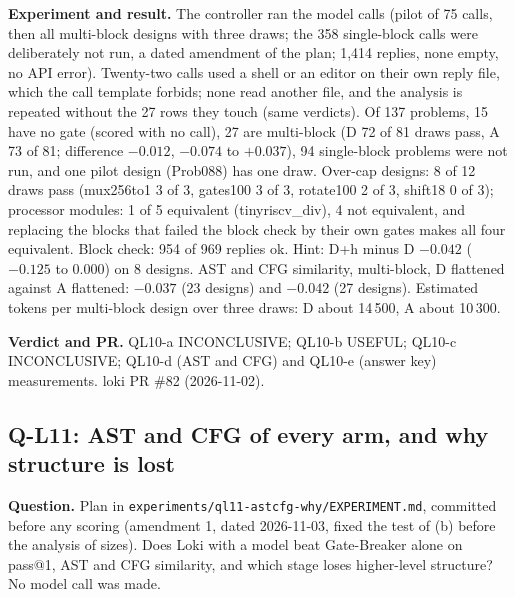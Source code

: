 \documentclass[conference]{IEEEtran}
\newcommand{\hev}[1]{\par\smallskip\noindent\textbf{#1}}
\newcommand{\code}[1]{\texttt{#1}}
\begin{document}
\hev{Experiment and result.} The controller ran the model calls (pilot of 75 calls, then all multi-block designs with three draws; the 358 single-block calls were deliberately not run, a dated amendment of the plan; 1,414 replies, none empty, no API error). Twenty-two calls used a shell or an editor on their own reply file, which the call template forbids; none read another file, and the analysis is repeated without the 27 rows they touch (same verdicts). Of 137 problems, 15 have no gate (scored with no call), 27 are multi-block (D 72 of 81 draws pass, A 73 of 81; difference $-0.012$, $-0.074$ to $+0.037$), 94 single-block problems were not run, and one pilot design (Prob088) has one draw. Over-cap designs: 8 of 12 draws pass (mux256to1 3 of 3, gates100 3 of 3, rotate100 2 of 3, shift18 0 of 3); processor modules: 1 of 5 equivalent (tinyriscv\_div), 4 not equivalent, and replacing the blocks that failed the block check by their own gates makes all four equivalent. Block check: 954 of 969 replies ok. Hint: D+h minus D $-0.042$ ($-0.125$ to 0.000) on 8 designs. AST and CFG similarity, multi-block, D flattened against A flattened: $-0.037$ (23 designs) and $-0.042$ (27 designs). Estimated tokens per multi-block design over three draws: D about 14\,500, A about 10\,300.

\hev{Verdict and PR.} QL10-a INCONCLUSIVE; QL10-b USEFUL; QL10-c INCONCLUSIVE; QL10-d (AST and CFG) and QL10-e (answer key) measurements. loki PR \#82 (2026-11-02).

\subsection{Q-L11: AST and CFG of every arm, and why structure is lost}
\label{rec:ql11}

\hev{Question.} Plan in \code{experiments/}\allowbreak\code{ql11-astcfg-why/}\allowbreak\code{EXPERIMENT.md}, committed before any scoring (amendment 1, dated 2026-11-03, fixed the test of (b) before the analysis of sizes). Does Loki with a model beat Gate-Breaker alone on pass@1, AST and CFG similarity, and which stage loses higher-level structure? No model call was made.
\end{document}
